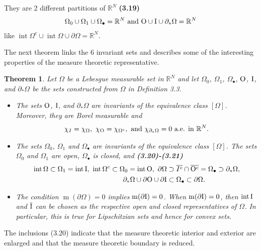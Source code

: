\documentclass{book}
\numberwithin{equation}{section}
\newtheorem{theorem}{Theorem}[section]
\begin{document}
\begin{enumerate}
    They are 2 different partitions of $\mathbb{R}^N$ \textbf{(3.19)}
    \begin{align*}
        \Omega_0\cup\Omega_1\cup\Omega_\bullet = \mathbb{R}^N \mbox{ and } {\rm O}\cup{\rm I}\cup\partial_*\Omega = \mathbb{R}^N
    \end{align*}
    like $\operatorname{int}\Omega^c\cup\operatorname{int}\Omega\cup\partial\Omega = \mathbb{R}^N$.
    
    The next theorem links the 6 invariant sets and describes some of the interesting properties of the measure theoretic representative.
    
    \begin{theorem}
        Let $\Omega$ be a Lebesgue measurable set in $\mathbb{R}^N$ and let $\Omega_0$, $\Omega_1$, $\Omega_\bullet$, ${\rm O}$, ${\rm I}$, and $\partial_*\Omega$ be the sets constructed from $\Omega$ in Definition 3.3.
        \begin{itemize}
            \item[(i)] The sets ${\rm O}$, ${\rm I}$, and $\partial_*\Omega$ are invariants of the equivalence class $[\Omega]$. Moreover, they are Borel measurable and
            \begin{align*}
                \chi_I = \chi_\Omega,\ \chi_{\rm O} = \chi_{\Omega^c}, \mbox{ and } \chi_{\partial_*\Omega} = 0 \mbox{ a.e. in } \mathbb{R}^N.
            \end{align*}
            \item[(ii)] The sets $\Omega_0$, $\Omega_1$ and $\Omega_\bullet$ are invariants of the equivalence class $[\Omega]$. The sets $\Omega_0$ and $\Omega_1$ are open, $\Omega_\bullet$ is closed, and \textbf{(3.20)-(3.21)}
            \begin{align*}
                \operatorname{int}\Omega\subset\Omega_1 = \operatorname{int}{\rm I},\ \operatorname{int}\Omega^c\subset\Omega_0 = \operatorname{int}{\rm O},\ \partial\Omega&\supset\overline{I^c}\cap\overline{{\rm O}^c} = \Omega_\bullet\supset\partial_*\Omega,\\
                \partial_*\Omega\cup\partial{\rm O}\cup\partial{\rm I}&\subset\Omega_\bullet\subset\partial\Omega.
            \end{align*}
            \item[(iii)] The condition $\operatorname{m}(\partial\Omega) = 0$ implies $\operatorname{m}(\partial{\rm I}) = 0$. When $\operatorname{m}(\partial{\rm I}) = 0$, then $\operatorname{int}{\rm I}$ and $\overline{\rm I}$ can be chosen as the respective open and closed representatives of $\Omega$. In particular, this is true for Lipschitzian sets and hence for convex sets.
        \end{itemize}
    \end{theorem}
    The inclusions (3.20) indicate that the measure theoretic interior and exterior are enlarged and that the measure theoretic boundary is reduced.
    

\end{enumerate}
\end{document}
